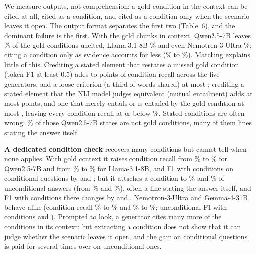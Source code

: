 We measure outputs, not comprehension: a gold condition in the context can be cited at all, cited as a condition, and cited as a condition only when the scenario leaves it open. The output format separates the first two (Table~6), and the dominant failure is the first. With the gold chunks in context, Qwen2.5-7B leaves \decGoldNotCitedQwen\% of the gold conditions uncited, Llama-3.1-8B \decGoldNotCitedLlama\% and even Nemotron-3-Ultra \decGoldNotCitedNemo\%; citing a condition only as evidence accounts for less (\decGoldEvOnlyOss\% to \decGoldEvOnlyLlama\%). Matching explains little of this. Crediting a stated element that restates a missed gold condition (token F1 at least 0.5) adds \auditRestateMin{} to \auditRestateMax{} points of condition recall across the five generators, and a loose criterion (a third of words shared) at most \auditLooseMax{}; crediting a stated element that the NLI model judges equivalent (mutual entailment) adds at most \semMutualMax{} points, and one that merely entails or is entailed by the gold condition at most \semEitherMax, leaving every condition recall at or below \semEitherRecallMax\%. Stated conditions are often wrong: \decGoldSpurQwen\% of those Qwen2.5-7B states are not gold conditions, many of them lines stating the answer itself.



\textbf{A dedicated condition check} recovers many conditions but cannot tell when none applies. With gold context it raises condition recall from \revVerGoldCondQwenRecallBase\% to \revVerGoldCondQwenRecall\% for Qwen2.5-7B and from \revVerGoldCondLlamaRecallBase\% to \revVerGoldCondLlamaRecall\% for Llama-3.1-8B, and F1 with conditions on conditional questions by \revVerGoldCondQwenPt{} and \revVerGoldCondLlamaPt; but it attaches a condition to \revVerGoldUncondQwenAny\% and \revVerGoldUncondLlamaAny\% of unconditional answers (from \revVerGoldUncondQwenAnyBase\% and \revVerGoldUncondLlamaAnyBase\%), often a line stating the answer itself, and F1 with conditions there changes by \revVerGoldUncondQwenPt{} and \revVerGoldUncondLlamaPt. Nemotron-3-Ultra and Gemma-4-31B behave alike (condition recall \revVerGoldCondNemoRecallBase\% to \revVerGoldCondNemoRecall\% and \revVerGoldCondGemmaRecallBase\% to \revVerGoldCondGemmaRecall\%; unconditional F1 with conditions \revVerGoldUncondNemoPt{} and \revVerGoldUncondGemmaPt). Prompted to look, a generator cites many more of the conditions in its context; but extracting a condition does not show that it can judge whether the scenario leaves it open, and the gain on conditional questions is paid for several times over on unconditional ones.

